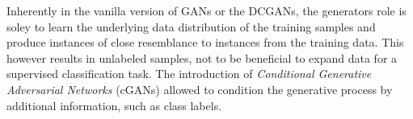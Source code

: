 Inherently in the vanilla version of GANs or the DCGANs, the generators role is soley to learn the underlying data distribution of the training samples and produce instances of close resemblance to instances from the training data. This however results in unlabeled samples, not to be beneficial to expand data for a supervised classification task. 
The introduction of \textit{Conditional Generative Adversarial Networks} (cGANs) allowed to condition the generative process by additional information, such as class labels. 






\newpage
